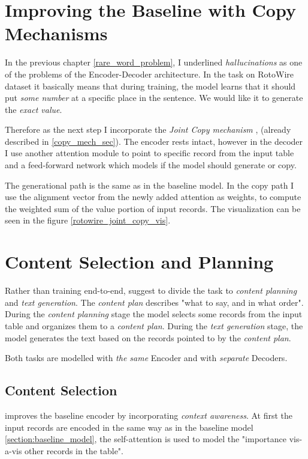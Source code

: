 \section{Improving the Baseline with Copy Mechanisms}

In the previous chapter \ref{rare_word_problem}, I underlined \emph{hallucinations} as one of the problems of the Encoder-Decoder architecture. In the task on RotoWire dataset it basically means that during training, the model learns that it should put \emph{some number} at a specific place in the sentence. We would like it to generate the \emph{exact value}.

Therefore as the next step I incorporate the \emph{Joint Copy mechanism} \citep{gu2016incorporating}, \citep{yang2016referenceaware} (already described in \ref{copy_mech_sec}). The encoder rests intact, however in the decoder I use another attention module to point to specific record from the input table and a feed-forward network which models if the model should generate or copy.

The generational path is the same as in the baseline model. In the copy path I use the alignment vector from the newly added attention as weights, to compute the weighted sum of the value portion of input records. The visualization can be seen in the figure \ref{rotowire_joint_copy_vis}.

\section{Content Selection and Planning}

Rather than training end-to-end, \citep{puduppully2019datatotext} suggest to divide the task to \emph{content planning} and \emph{text generation}. The \emph{content plan} describes "what to say, and in what order". During the \emph{content planning} stage the model selects some records from the input table and organizes them to a \emph{content plan}. During the \emph{text generation} stage, the model generates the text based on the records pointed to by the \emph{content plan}.

Both tasks are modelled with \emph{the same} Encoder and with \emph{separate} Decoders.

\subsection{Content Selection}

\citep{puduppully2019datatotext} improves the baseline encoder by incorporating \emph{context awareness}. At first the input records are encoded in the same way as in the baseline model \ref{section:baseline_model}, the self-attention is used to model the "importance vis-a-vis other records in the table".

